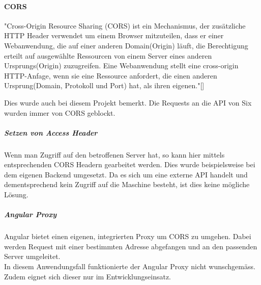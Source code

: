 \paragraph{CORS}\label{CORS}
"Cross-Origin Resource Sharing (CORS) ist ein Mechanismus, der zusätzliche HTTP Header verwendet um einem Browser mitzuteilen, dass er einer Webanwendung, die auf einer anderen Domain(Origin) läuft, die Berechtigung erteilt auf ausgewählte Ressourcen von einem Server eines anderen Ursprungs(Origin) zuzugreifen. Eine Webanwendung stellt eine cross-origin HTTP-Anfage, wenn sie eine Ressource anfordert, die einen anderen Ursprung(Domain, Protokoll und Port) hat, als ihren eigenen."[\cite{cors}]

Dies wurde auch bei diesem Projekt bemerkt. Die Requests an die API von Six wurden immer von \ac{CORS} geblockt. 

\subparagraph{Setzen von Access Header}
Wenn man Zugriff auf den betroffenen Server hat, so kann hier mittels entsprechenden CORS Headern gearbeitet werden. Dies wurde beispielsweise bei dem eigenen Backend umgesetzt. Da es sich um eine externe API handelt und dementsprechend kein Zugriff auf die Maschine besteht, ist dies keine mögliche Lösung. 

\subparagraph{Angular Proxy}
Angular bietet einen eigenen, integrierten Proxy um \ac{CORS} zu umgehen. Dabei werden Request mit einer bestimmten Adresse abgefangen und an den passenden Server umgeleitet.\\
In diesem Anwendungsfall funktionierte der Angular Proxy nicht wunschgemäss. Zudem eignet sich dieser nur im Entwicklungseinsatz. 

